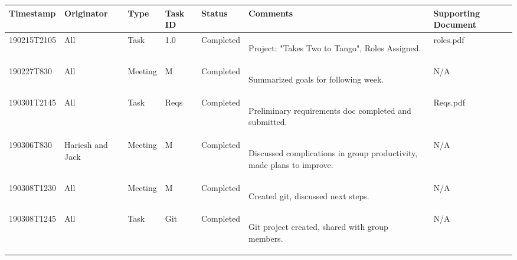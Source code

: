 \documentclass[12pt]{article}
\begin{document}
\begin{center}
\begin{tabular}{ | m{2.3cm} | m{1.8cm} | m{1.5cm} | m{1.2cm} | m{2cm} | m{3cm} | m{2.7cm} | } 
\hline
\textbf{Timestamp} & \textbf{Originator} & \textbf{Type} & \textbf{Task ID} & \textbf{Status} & \textbf{Comments} & \textbf{Supporting Document} \\
\hline
190215T2105 & All & Task & 1.0 & Completed & \begin{center}Project: "Takes Two to Tango", Roles Assigned.\end{center} & roles.pdf\\
\hline
190227T830 & All & Meeting & M & Completed & \begin{center}Summarized goals for following week. \end{center} & N/A \\
\hline
190301T2145 & All & Task & Reqs & Completed & \begin{center}Preliminary requirements doc completed and submitted.\end{center} & Reqs.pdf\\
\hline
190306T830 & Hariesh and Jack & Meeting & M & Completed & \begin{center}Discussed complications in group productivity, made plans to improve. \end{center} & N/A \\
\hline
190308T1230 & All & Meeting & M & Completed & \begin{center}Created git, discussed next steps. \end{center} & N/A \\
\hline
190308T1245 & All & Task & Git & Completed & \begin{center}Git project created, shared with group members.\end{center} & N/A\\
\hline
\end{tabular}
\end{center}
\end{document}
